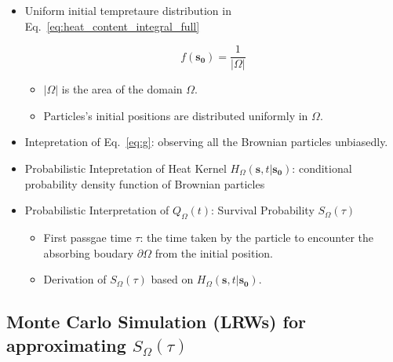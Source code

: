       \begin{itemize}
        \item Uniform initial tempretaure distribution in Eq.~\ref{eq:heat_content_integral_full}
          \par
          \begin{equation}\label{eq:uniform_initial_condition}
             f(\bm{s_0}) = \frac{1}{|\Omega|} 
          \end{equation}
          
          \begin{itemize}
           \item $|\Omega|$ is the area of the domain $\Omega$.
           \item Particles's initial positions are distributed uniformly in $\Omega$.
          \end{itemize}

        \item Intepretation of Eq.~\ref{eq:g}: observing all the Brownian particles unbiasedly.

        \item Probabilistic Intepretation of Heat Kernel $H_{\Omega}(\bm{s}, t | \bm{s_0})$: conditional probability density function of Brownian particles

        \item Probabilistic Interpretation of $Q_{\Omega}(t)$: Survival Probability $S_{\Omega}(\tau)$

          \begin{itemize}
           \item First passgae time $\tau$: the time taken by the particle to encounter the absorbing boudary $\partial \Omega$ from the initial position.
           \item Derivation of $S_{\Omega}(\tau)$ based on $H_{\Omega}(\bm{s}, t | \bm{s_0})$.
          \end{itemize}
    
      \end{itemize}


    \subsection{Monte Carlo Simulation (LRWs) for approximating $S_{\Omega}(\tau)$}

